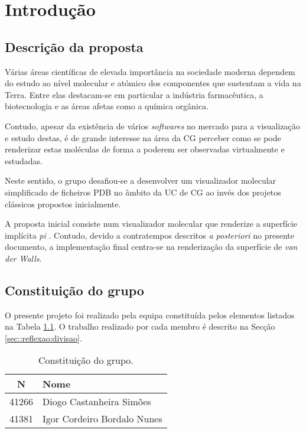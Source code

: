 \chapter{Introdução}
\label{chap:intro}

\section{Descrição da proposta}
\label{sec::intro:descricao}

Várias áreas científicas de elevada importância na sociedade moderna dependem do estudo ao nível molecular e atómico dos componentes que sustentam a vida na Terra. Entre elas destacam-se em particular a indústria farmacêutica, a biotecnologia e as áreas afetas como a química orgânica.

Contudo, apesar da existência de vários \textit{softwares} no mercado para a visualização e estudo destas, é de grande interesse na área da \ac{CG} perceber como se pode renderizar estas moléculas de forma a poderem ser observadas virtualmente e estudadas.

Neste sentido, o grupo desafiou-se a desenvolver um visualizador molecular simplificado de ficheiros \ac{PDB} no âmbito da \ac{UC} de \ac{CG} ao invés dos projetos clássicos propostos inicialmente.

A proposta inicial consiste num visualizador molecular que renderize a superfície implícita \textit{pi} \cite{DBLP:journals/corr/abs-1906-06751}. Contudo, devido a contratempos descritos \textit{a posteriori} no presente documento, a implementação final centra-se na renderização da superfície de \textit{van der Walls}.


\section{Constituição do grupo}
\label{sec::intro:grupo}

O presente projeto foi realizado pela equipa constituída pelos elementos listados na Tabela \ref{tab::team}. O trabalho realizado por cada membro é descrito na Secção \ref{sec::reflexao:divisao}.

\begin{table}[!h]
	\centering
	\begin{tabular}{c l}
		\toprule
		\textbf{N\textordmasculine} & \textbf{Nome} \\
		\midrule
		41266 & Diogo Castanheira Simões    \\
		41381 & Igor Cordeiro Bordalo Nunes \\
		\bottomrule
	\end{tabular}
	\caption[Constituição do grupo]{Constituição do grupo.}
	\label{tab::team}
\end{table}


